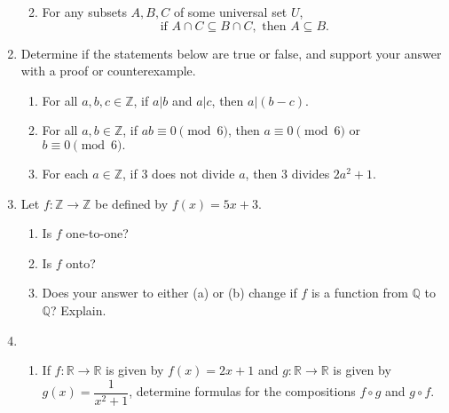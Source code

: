 \documentclass[12pt]{article}
\newcommand{\points}[1]{\marginpar{\hspace{24pt}[#1]}}
\newcommand{\R}{\mathbb{R}}
\newcommand{\Z}{\mathbb{Z}}
\newcommand{\Q}{\mathbb{Q}}
\begin{document}
\begin{enumerate}
\begin{enumerate}
\vspace{4in}

 \item For any subsets $A,B,C$ of some universal set $U$,  \points{4}
\[
\text{if } A\cap C\subseteq B\cap C, \text{ then } A\subseteq B.
\]

\end{enumerate}
\newpage

\item Determine if the statements below are true or false, and support your answer with a proof or counterexample.
\begin{enumerate}
       \item For all $a,b,c\in \Z$, if $a|b$ and $a|c$, then $a|(b-c)$.\points{4}

\vspace{2.5in}

       \item For all $a,b\in\Z$, if $ab\equiv 0\pmod{6}$, then $a\equiv 0\pmod{6}$ or $b\equiv 0\pmod{6}.$\points{4}

\vspace{2in}

       \item For each $a\in \Z$, if 3 does not divide $a$, then 3 divides $2a^2+1$.\points{4}
      \end{enumerate}
\newpage

\item Let $f:\Z\to \Z$ be defined by $f(x) = 5x+3$.
\begin{enumerate}
 \item Is $f$ one-to-one? \points{3}

\vspace{2.5in}

 \item Is $f$ onto? \points{3}

\vspace{2.5in}

 \item Does your answer to either (a) or (b) change if $f$ is a function from $\Q$ to $\Q$? Explain. \points{3}
\end{enumerate}

\newpage

\item \begin{enumerate}
       \item If $f:\R\to\R$ is given by $f(x) = 2x+1$ and $g:\R\to\R$ is given by $g(x) = \dfrac{1}{x^2+1}$, \points{4} determine formulas for the compositions $f\circ g$ and $g\circ f$.


\end{enumerate}
\end{enumerate}
\end{document}

